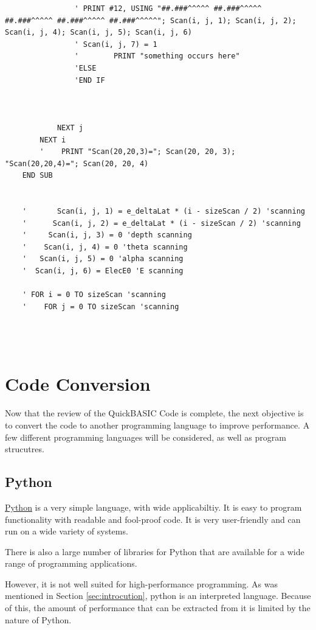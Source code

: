 \documentclass[10pt, reqno]{exam}
\begin{document}
\begin{verbatim}
                ' PRINT #12, USING "##.###^^^^^ ##.###^^^^^ ##.###^^^^^ ##.###^^^^^ ##.###^^^^^"; Scan(i, j, 1); Scan(i, j, 2); Scan(i, j, 4); Scan(i, j, 5); Scan(i, j, 6)
                ' Scan(i, j, 7) = 1
                '        PRINT "something occurs here"
                'ELSE
                'END IF
    
    
    
            NEXT j
        NEXT i
        '    PRINT "Scan(20,20,3)="; Scan(20, 20, 3); "Scan(20,20,4)="; Scan(20, 20, 4)
    END SUB
    
    
    '       Scan(i, j, 1) = e_deltaLat * (i - sizeScan / 2) 'scanning
    '      Scan(i, j, 2) = e_deltaLat * (i - sizeScan / 2) 'scanning
    '     Scan(i, j, 3) = 0 'depth scanning
    '    Scan(i, j, 4) = 0 'theta scanning
    '   Scan(i, j, 5) = 0 'alpha scanning
    '  Scan(i, j, 6) = ElecE0 'E scanning
    
    ' FOR i = 0 TO sizeScan 'scanning
    '    FOR j = 0 TO sizeScan 'scanning


    
\end{verbatim}

\section{Code Conversion}

Now that the review of the QuickBASIC Code is complete, the next objective is to convert the code to another programming language to improve performance. A few different programming languages will be considered, as well as program strucutres.


\subsection{Python}

\href{https://en.wikipedia.org/wiki/Python_(programming_language)}{Python} is a very simple language, with wide applicabiltiy. It is easy to program functionality with readable and fool-proof code. It is very user-friendly and can run on a wide variety of systems. \par

There is also a large number of libraries for Python that are available for a wide range of programming applications. \par

However, it is not well suited for high-performance programming. As was mentioned in Section \ref{sec:introcution}, python is an interpreted language. Because of this, the amount of performance that can be extracted from it is limited by the nature of Python. \par
\end{document}
